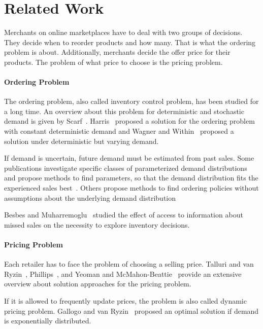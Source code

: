 
\chapter{Related Work}

Merchants on online marketplaces have to deal with two groups of decisions.
They decide when to reorder products and how many.
That is what the ordering problem is about.
Additionally, merchants decide the offer price for their products.
The problem of what price to choose is the pricing problem.

\subsubsection*{Ordering Problem}
The ordering problem, also called inventory control problem, has been studied for a long time.
An overview about this problem for deterministic and stochastic demand is given by Scarf~\cite{scarf1963survey}.
Harris~\cite{harris1913many} proposed a solution for the ordering problem with constant deterministic demand and Wagner and Within~\cite{wagner1958dynamic} proposed a solution under deterministic but varying demand.

If demand is uncertain, future demand must be estimated from past sales.
Some publications investigate specific classes of parameterized demand distributions and propose methods to find parameters, so that the demand distribution fits the experienced sales best~\cite{azoury1985bayes}.
Others propose methods to find ordering policies without assumptions about the underlying demand distribution~\cite{DBLP:journals/mor/LeviRS07,huh2011adaptive,ban2017big}

Besbes and Muharremoglu~\cite{DBLP:journals/mansci/BesbesM13} studied the effect of access to information about missed sales on the necessity to explore inventory decisions.

\subsubsection*{Pricing Problem}
Each retailer has to face the problem of choosing a selling price.
Talluri and van Ryzin~\cite{talluri2004theory}, Phillips~\cite{phillips2005pricing}, and Yeoman and McMahon-Beattie~\cite{yeoman2010revenue} provide an extensive overview about solution approaches for the pricing problem.

If it is allowed to frequently update prices, the problem is also called dynamic pricing problem.
Gallogo and van Ryzin~\cite{gallego1994optimal} proposed an optimal solution if demand is exponentially distributed.

